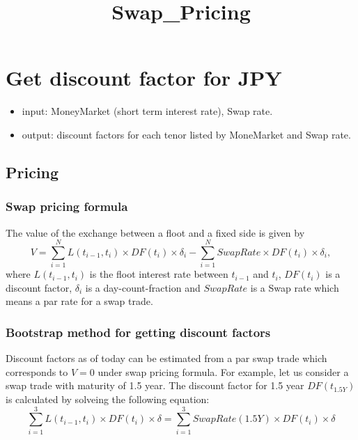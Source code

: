 \documentclass[11pt]{article}
\title{Swap\_Pricing}
\providecommand{\tightlist}{%
      \setlength{\itemsep}{0pt}\setlength{\parskip}{0pt}}
\begin{document}
    
    
    \maketitle
    
    

    
    \section{Get discount factor for JPY}\label{get-discount-factor-for-jpy}

\begin{itemize}
\tightlist
\item
  input: MoneyMarket (short term interest rate), Swap rate.
\item
  output: discount factors for each tenor listed by MoneMarket and Swap
  rate.
\end{itemize}

\subsection{Pricing}\label{pricing}

\subsubsection{Swap pricing formula}\label{swap-pricing-formula}

The value of the exchange between a floot and a fixed side is given by
\[
V = \sum_{i = 1}^{N}  L(t_{i-1}, t_{i}) \times DF(t_{i}) \times \delta_{i} - \sum_{i = 1}^{N} SwapRate \times DF(t_{i})\times \delta_{i},
\] where \(L(t_{i-1}, t_{i})\) is the floot interest rate between
\(t_{i-1}\) and \(t_{i}\), \(DF(t_{i})\) is a discount factor,
\(\delta_{i}\) is a day-count-fraction and \(SwapRate\) is a Swap rate
which means a par rate for a swap trade.

\subsubsection{Bootstrap method for getting discount
factors}\label{bootstrap-method-for-getting-discount-factors}

Discount factors as of today can be estimated from a par swap trade
which corresponds to \(V = 0\) under swap pricing formula. For example,
let us consider a swap trade with maturity of 1.5 year. The discount
factor for 1.5 year \(DF(t_{1.5Y})\) is calculated by solveing the
following equation: \[
\sum_{i = 1}^{3}  L(t_{i-1}, t_{i}) \times DF(t_{i}) \times \delta = \sum_{i = 1}^{3} SwapRate(1.5Y) \times DF(t_{i})\times \delta
\]
\end{document}
